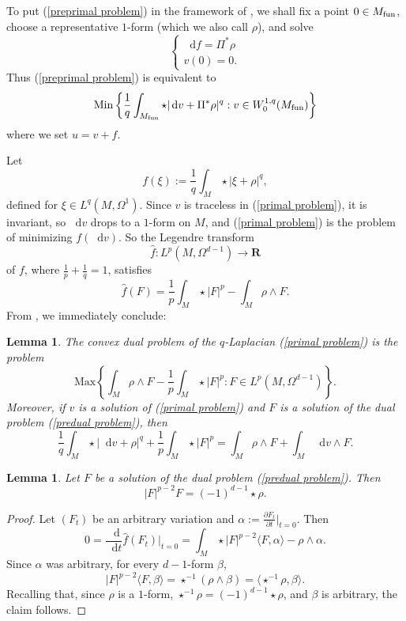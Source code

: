 \documentclass[reqno,11pt]{amsart}
\newcommand{\RR}{\mathbf{R}}
\newcommand*\dif{\mathop{}\!\mathrm{d}}
\newcommand{\Min}{\mathrm{Min}}
\newcommand{\Max}{\mathrm{Max}}
\newtheorem{lemma}[theorem]{Lemma}
\theoremstyle{definition}
\numberwithin{equation}{section}
\begin{document}
To put (\ref{preprimal problem}) in the framework of \cite[Chapter IV]{Ekeland99}, we shall fix a point $0 \in M_{\rm fun}$, choose a representative $1$-form (which we also call $\rho$), and solve 
$$\begin{cases}
\dif f = \Pi^* \rho \\
v(0) = 0.
\end{cases}$$
Thus (\ref{preprimal problem}) is equivalent to
\begin{equation}\label{primal problem}
	\Min\left\{\frac{1}{q} \int_{M_{\rm fun}} \star|\dif v + \Pi^* \rho|^q: v \in W^{1, q}_0(M_{\rm fun})\right\}
\end{equation}
where we set $u = v + f$.

Let
$$f(\xi) := \frac{1}{q} \int_M \star|\xi + \rho|^q,$$
defined for $\xi \in L^q(M, \Omega^1)$.
Since $v$ is traceless in (\ref{primal problem}), it is invariant, so $\dif v$ drops to a $1$-form on $M$, and (\ref{primal problem}) is the problem of minimizing $f(\dif v)$.
So the Legendre transform
$$\hat f: L^p(M, \Omega^{d - 1}) \to \RR$$
of $f$, where $\frac{1}{p} + \frac{1}{q} = 1$, satisfies
$$\hat f(F) = \frac{1}{p} \int_M \star |F|^p - \int_M \rho \wedge F.$$
From \cite[III(4.18) and III(4.23)]{Ekeland99}, we immediately conclude:

\begin{lemma}
The convex dual problem of the $q$-Laplacian (\ref{primal problem}) is the problem 
\begin{equation}\label{predual problem}
\Max\left\{\int_M \rho \wedge F - \frac{1}{p} \int_M \star |F|^p: F \in L^p(M, \Omega^{d - 1})\right\}.
\end{equation}
Moreover, if $v$ is a solution of (\ref{primal problem}) and $F$ is a solution of the dual problem (\ref{predual problem}), then
\begin{equation}\label{extremality relations}
\frac{1}{q} \int_M \star |\dif v + \rho|^q + \frac{1}{p} \int_M \star |F|^p = \int_M \rho \wedge F + \int_M \dif v \wedge F.
\end{equation}
\end{lemma}

\begin{lemma}
Let $F$ be a solution of the dual problem (\ref{predual problem}). Then
\begin{equation}\label{EL of hat G}
|F|^{p - 2} F = (-1)^{d - 1} \star \rho.
\end{equation}
\end{lemma}
\begin{proof}
Let $(F_t)$ be an arbitrary variation and $\alpha := \frac{\partial F_t}{\partial t}|_{t = 0}$. Then 
$$0 = \frac{\dif}{\dif t} \hat f(F_t)\bigg|_{t = 0} = \int_M \star |F|^{p - 2} \langle F, \alpha \rangle - \rho \wedge \alpha.$$
Since $\alpha$ was arbitrary, for every $d-1$-form $\beta$,
$$|F|^{p - 2} \langle F, \beta\rangle = \star^{-1}(\rho \wedge \beta) = \langle \star^{-1} \rho, \beta\rangle.$$
Recalling that, since $\rho$ is a $1$-form, $\star^{-1} \rho = (-1)^{d - 1} \star \rho$, and $\beta$ is arbitrary, the claim follows.
\end{proof}
\end{document}
